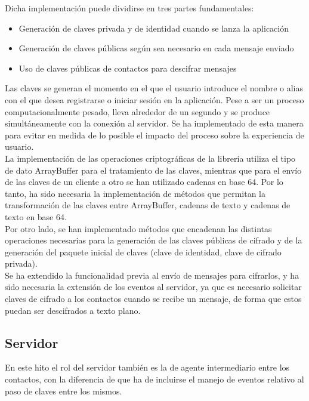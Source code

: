 Dicha implementación puede dividirse en tres partes fundamentales: 

\begin{itemize}
\item {Generación de claves privada y de identidad cuando se lanza la aplicación}
\item {Generación de claves públicas según sea necesario en cada mensaje enviado}
\item {Uso de claves públicas de contactos para descifrar mensajes}
\end{itemize}

Las claves se generan el momento en el que el usuario introduce el nombre o alias con el que desea registrarse o iniciar sesión en la aplicación. Pese a ser un proceso computacionalmente pesado, lleva alrededor de un segundo y se produce simultáneamente con la conexión al servidor. Se ha implementado de esta manera para evitar en medida de lo posible el impacto del proceso sobre la experiencia de usuario. \\

La implementación de las operaciones criptográficas de la librería utiliza el tipo de dato ArrayBuffer para el tratamiento de las claves, mientras que para el envío de las claves de un cliente a otro se han utilizado cadenas en base 64. Por lo tanto, ha sido necesaria la implementación de métodos que permitan la transformación de las claves entre ArrayBuffer, cadenas de texto y cadenas de texto en base 64. \\

Por otro lado, se han implementado métodos que encadenan las distintas operaciones necesarias para la generación de las claves públicas de cifrado y de la generación del paquete inicial de claves (clave de identidad, clave de cifrado privada). \\

Se ha extendido la funcionalidad previa al envío de mensajes para cifrarlos, y ha sido necesaria la extensión de los eventos al servidor, ya que es necesario solicitar claves de cifrado a los contactos cuando se recibe un mensaje, de forma que estos puedan ser descifrados a texto plano.

\subsection{Servidor}

En este hito el rol del servidor también es la de agente intermediario entre los contactos, con la diferencia de que ha de incluirse el manejo de eventos relativo al paso de claves entre los mismos.

